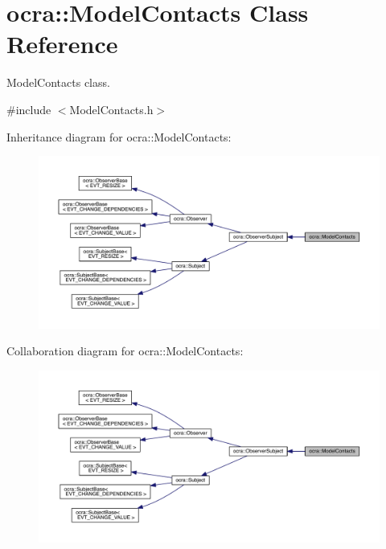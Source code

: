 \hypertarget{classocra_1_1ModelContacts}{}\section{ocra\+:\+:Model\+Contacts Class Reference}
\label{classocra_1_1ModelContacts}


Model\+Contacts class.  




{\ttfamily \#include $<$Model\+Contacts.\+h$>$}



Inheritance diagram for ocra\+:\+:Model\+Contacts\+:\nopagebreak
\begin{figure}[H]
\begin{center}
\leavevmode
\includegraphics[width=350pt]{db/d08/classocra_1_1ModelContacts__inherit__graph}
\end{center}
\end{figure}


Collaboration diagram for ocra\+:\+:Model\+Contacts\+:\nopagebreak
\begin{figure}[H]
\begin{center}
\leavevmode
\includegraphics[width=350pt]{dd/d24/classocra_1_1ModelContacts__coll__graph}
\end{center}
\end{figure}
